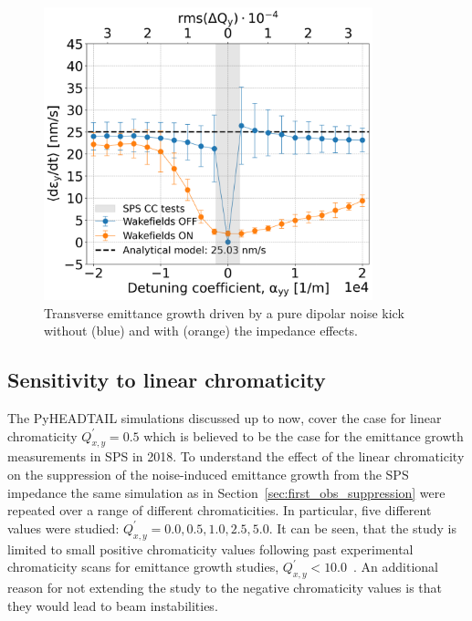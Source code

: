 \begin{figure}[!h] %
    \centering         
    \includegraphics[width=0.85\textwidth]{images/Ch7/deyRates_final_2018_dipolar_noise_sps_270GeV_DipoleNoiseSQRT1e-8_y-plane_QpxQpy5e-1_6D_Nb5e5_intensity3e10_ayyScan_wakesON_vs_OFF_vs_TuneSpreadvsExpectedSPS.png}
        \caption{Transverse emittance growth driven by a pure dipolar noise kick without (blue) and with (orange) the impedance effects.}
        \label{fig:study_5_dipole_noise}
 \end{figure}



\subsection{Sensitivity to linear chromaticity}\label{subsec:chroma_scan}
The PyHEADTAIL simulations discussed up to now, cover the case for linear chromaticity $Q^\prime_{x,y}=0.5$ which is believed to be the case for the emittance growth measurements in SPS in 2018. To understand the effect of the linear chromaticity on the suppression of the noise-induced emittance growth from the SPS impedance the same simulation as in Section~\ref{sec:first_obs_suppression} were repeated over a range of different chromaticities. In particular, five different values were studied: $Q^\prime_{x,y}=0.0, 0.5, 1.0, 2.5, 5.0$. It can be seen, that the study is limited to small positive chromaticity values following past experimental chromaticity scans for emittance growth studies,  $Q^\prime_{x,y}< 10.0$~\cite{Antoniou:2649815, Calaga:1451286}. An additional reason for not extending the study to the negative chromaticity values is that they would lead to beam instabilities.


